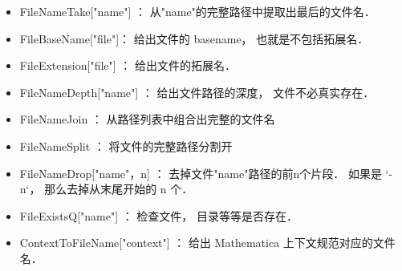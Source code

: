 
\begin{itemize}
\item FileNameTake["name"] ： 从"name"的完整路径中提取出最后的文件名．
\item FileBaseName["file"]： 给出文件的 basename， 也就是不包括拓展名．
\item FileExtension["file"]  ： 给出文件的拓展名．
\item FileNameDepth["name"] ： 给出文件路径的深度， 文件不必真实存在．
\end{itemize}


\begin{itemize}
\item FileNameJoin ： 从路径列表中组合出完整的文件名
\item FileNameSplit ： 将文件的完整路径分割开
\item FileNameDrop["name"，n] ： 去掉文件"name"路径的前n个片段． 如果是 \ver`-n`， 那么去掉从末尾开始的 n 个．
\item FileExistsQ["name"]  ： 检查文件， 目录等等是否存在．
\item ContextToFileName["context"]  ： 给出 Mathematica 上下文规范对应的文件名．
\end{itemize}



